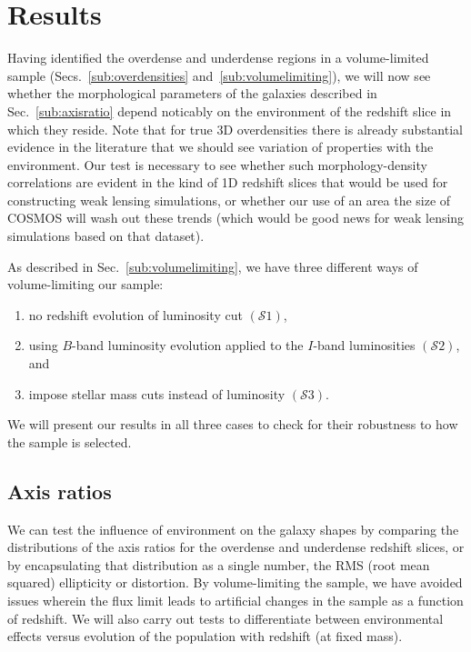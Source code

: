 \documentclass[twocolumn,useAMS,usenatbib]{mn2e}
\newcommand{\s}{\ensuremath{\mathcal{S}}}
\begin{document}
\section{Results}
\label{S:results}

Having identified the overdense and underdense regions in a
volume-limited sample (Secs.~\ref{sub:overdensities}
and~\ref{sub:volumelimiting}), we will now see whether the morphological
parameters of the galaxies described in Sec.~\ref{sub:axisratio}
depend noticably on the environment of the redshift slice in which
they reside. Note that for true 3D overdensities there is already
substantial evidence in the literature that we should see variation of
properties with the environment.  Our test is necessary to see
whether such morphology-density correlations are evident in the kind
of 1D redshift slices that would be used for constructing weak lensing
simulations, or whether our use of an area the size of COSMOS will
wash out these trends (which would be good news for weak lensing
simulations based on that dataset).

As described in Sec.~\ref{sub:volumelimiting}, we have three different ways of volume-limiting our sample:
\begin{enumerate}
 \item no redshift evolution of luminosity cut $(\s1)$,
 \item using $B$-band luminosity evolution applied to the $I$-band
   luminosities $(\s2)$, and
 \item impose stellar mass cuts instead of luminosity $(\s3)$.
\end{enumerate}

We will present our results in all three cases to check for their
robustness to how the sample is selected. 

\subsection{Axis ratios} 

We can test the influence of environment on the galaxy shapes by
comparing the distributions of the axis ratios for the overdense and
underdense redshift slices, or by encapsulating that distribution as a
single number, the RMS (root mean squared) ellipticity or distortion. By
volume-limiting the sample, we have avoided issues
wherein the flux limit leads to artificial changes in the sample as a
function of redshift.  We will also carry out tests to differentiate
between environmental effects versus evolution of the population with
redshift (at fixed mass).
\end{document}
